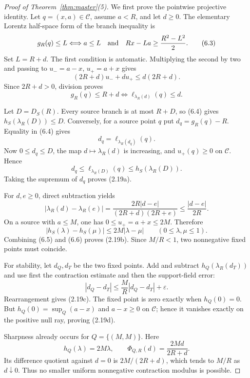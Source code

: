 \documentclass[11pt]{article}
\theoremstyle{remark}
\begin{document}
\begin{proof}[Proof of Theorem~\ref{thm:master}(5)]
We first prove the pointwise projective identity.  Let $q=(x,a)\in\mathcal C$, assume
$a<R$, and let $d\ge0$.  The elementary Lorentz half-space form of the branch inequality is
\begin{equation}
 g_R(q)\le L
 \Longleftrightarrow
 a\le L\quad\hbox{and}\quad
 Rx-La\ge\frac{R^2-L^2}{2}.
 \tag{6.3}
\end{equation}
Set $L=R+d$.  The first condition is automatic.  Multiplying the second by two and passing to
$u_-=a-x$, $u_+=a+x$ gives
\[
 (2R+d)u_-+d u_+\le d(2R+d).
\]
Since $2R+d>0$, division proves
\begin{equation}
 g_R(q)\le R+d
 \Longleftrightarrow
 \ell_{\lambda_R(d)}(q)\le d.
 \tag{6.4}
\end{equation}

Let $D=D_S(R)$.  Every source branch is at most $R+D$, so (6.4) gives
$h_S(\lambda_R(D))\le D$.  Conversely, for a source point $q$ put
$d_q=g_R(q)-R$.  Equality in (6.4) gives
\[
 d_q=\ell_{\lambda_R(d_q)}(q).
\]
Now $0\le d_q\le D$, the map $d\mapsto\lambda_R(d)$ is increasing, and $u_+(q)\ge0$ on
$\mathcal C$.  Hence
\[
 d_q\le\ell_{\lambda_R(D)}(q)\le h_S(\lambda_R(D)).
\]
Taking the supremum of $d_q$ proves (2.19a).

For $d,e\ge0$, direct subtraction yields
\begin{equation}
 |\lambda_R(d)-\lambda_R(e)|
 =\frac{2R|d-e|}{(2R+d)(2R+e)}
 \le\frac{|d-e|}{2R}.
 \tag{6.5}
\end{equation}
On a source with $a\le M$, one has $0\le u_+=a+x\le2M$.  Therefore
\begin{equation}
 |h_S(\lambda)-h_S(\mu)|\le2M|\lambda-\mu|
 \qquad(0\le\lambda,\mu\le1).
 \tag{6.6}
\end{equation}
Combining (6.5) and (6.6) proves (2.19b).  Since $M/R<1$, two nonnegative fixed points must
coincide.

For stability, let $d_Q,d_T$ be the two fixed points.  Add and subtract
$h_Q(\lambda_R(d_T))$ and use first the contraction estimate and then the support-field error:
\[
 |d_Q-d_T|\le\frac MR|d_Q-d_T|+\varepsilon.
\]
Rearrangement gives (2.19c).  The fixed point is zero exactly when $h_Q(0)=0$.  But
$h_Q(0)=\sup_Q(a-x)$ and $a-x\ge0$ on $\mathcal C$; hence it vanishes exactly on the positive
null ray, proving (2.19d).

Sharpness already occurs for $Q=\{(M,M)\}$.  Here
\[
 h_Q(\lambda)=2M\lambda,
 \qquad \Phi_{Q,R}(d)=\frac{2Md}{2R+d}.
\]
Its difference quotient against $d=0$ is $2M/(2R+d)$, which tends to $M/R$ as $d\downarrow0$.
Thus no smaller uniform nonnegative contraction modulus is possible.


\end{proof}
\end{document}
